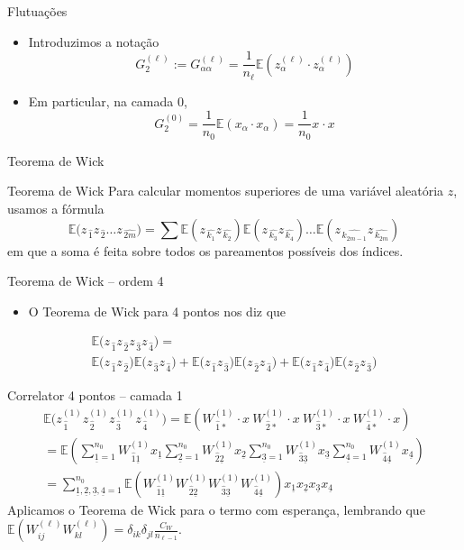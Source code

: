 \documentclass{beamer}
\newcommand{\EE}{\mathbb{E}}
\newcommand{\aaA}{\alpha}
\def\mi#1{{\,\widehat{#1}}}
\def\mj#1{\underline{#1}}
\def\eell{{(\ell)}}
\begin{document}
\begin{frame}{Flutuações}
	\begin{itemize}
		\item Introduzimos a notação 
		\begin{equation*}\tag{3.17}
			G^\eell_2 := G^\eell_{\aaA\aaA}   = \frac{1}{n_\ell}\EE\left(z^\eell_{\aaA}\cdot z^\eell_{\aaA}\right) 
		\end{equation*}
		\item Em particular, na camada 0, 
		\begin{equation*}
			G^{(0)}_2 = \frac{1}{n_0}\EE\left(x_{\aaA}\cdot x_{\aaA}\right) = \frac{1}{n_0}x_{}\cdot x_{} 
		\end{equation*}
	\end{itemize}
\end{frame}

\begin{frame}{Teorema de Wick}
	\begin{block}{Teorema de Wick}
		Para calcular momentos superiores de uma variável aleatória $z$, usamos a fórmula 
		$$\EE\big(z_{\mi1} z_{\mi2} \ldots z_{\mi{2m}}\big) = \sum\EE(z_{\mi{k_1}}z_{\mi{k_2}})\EE(z_{\mi{k_3}}z_{\mi{k_4}})\ldots\EE(z_{\mi{k_{2m-1}}}z_{\mi{k_{2m}}})$$
		em que a soma é feita sobre todos os pareamentos possíveis dos índices.
	\end{block}
\end{frame}

\begin{frame}{Teorema de Wick -- ordem 4}
	\begin{itemize}
		\item O Teorema de Wick para 4 pontos nos diz que
	\end{itemize}
	\begin{multline*}
		\EE\big(z_{\mi1} z_{\mi2} z_{\mi3} z_{\mi4}\big) = \\
		\EE\big(z_{\mi1} z_{\mi2}\big)\EE\big(z_{\mi3} z_{\mi4}\big) 
		+ \EE\big(z_{\mi1} z_{\mi3}\big)\EE\big(z_{\mi2} z_{\mi4}\big)
		+ \EE\big(z_{\mi1} z_{\mi4}\big)\EE\big(z_{\mi2} z_{\mi3}\big)
	\end{multline*}
\end{frame}

\begin{frame}{Correlator 4 pontos -- camada 1}
	\begin{multline*}\tag{3.18}
		\EE\big(z^{(1)}_{\mi1} z^{(1)}_{\mi2} z^{(1)}_{\mi3} z^{(1)}_{\mi4}\big) = \EE\left(W^{(1)}_{\mi1*}\cdot x \ W^{(1)}_{\mi2*}\cdot x \ W^{(1)}_{\mi3*}\cdot x \ W^{(1)}_{\mi4*}\cdot x\right)\\
		= \EE\left( \sum_{\mj1=1}^{n_0}W^{(1)}_{\mi1\mj1} x_{\mj1} \sum_{\mj2=1}^{n_0}W^{(1)}_{\mi2\mj2} x_{\mj2} \sum_{\mj3=1}^{n_0}W^{(1)}_{\mi3\mj3} x_{\mj3} \sum_{\mj4=1}^{n_0}W^{(1)}_{\mi4\mj4} x_{\mj4}   \right)   \\ 
		= \sum_{\mj1,\mj2,\mj3,\mj4=1}^{n_0} \EE\left(W^{(1)}_{\mi1\mj1}W^{(1)}_{\mi2\mj2}W^{(1)}_{\mi3\mj3}W^{(1)}_{\mi4\mj4}\right) x_{\mj1}x_{\mj2}x_{\mj3}x_{\mj4} 
	\end{multline*}
	Aplicamos o Teorema de Wick para o termo com esperança, lembrando que $\EE\left(W^\eell_{ij}W^\eell_{kl}\right) = \delta_{ik}\delta_{jl}\frac{C_W}{n_{\ell-1}}$.
\end{frame}
\end{document}
